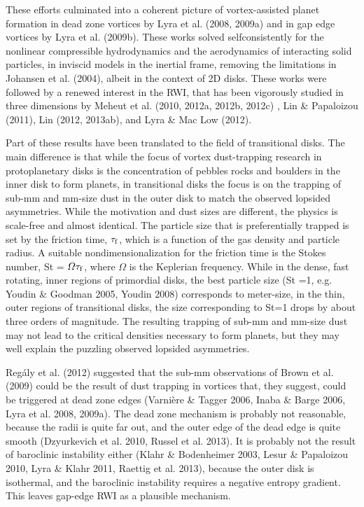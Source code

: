 \documentclass[apj]{emulateapj}
\begin{document}
These efforts culminated into a coherent picture of vortex-assisted
planet formation in dead zone vortices by Lyra et al. (2008, 2009a) and in 
gap edge vortices by Lyra et al. (2009b). These works solved
selfconsistently for the nonlinear compressible hydrodynamics and the
aerodynamics of interacting solid particles, in inviscid models in the
inertial frame, removing the limitations in Johansen et al. (2004),
albeit in the context of 2D disks. These works were followed by a renewed
interest in the RWI, that has been vigorously studied in three
dimensions by Meheut et al. (2010, 2012a, 2012b, 2012c) , Lin \&
Papaloizou (2011),  Lin (2012, 2013ab), and Lyra \& Mac Low (2012). 

Part of these results have been translated to the field of
transitional disks. The main difference is that while the focus 
of vortex dust-trapping research in protoplanetary disks is the
concentration of pebbles rocks and boulders in the inner disk to form
planets, in transitional disks the focus is on the trapping of sub-mm
and mm-size dust in the outer disk to match the observed lopsided 
asymmetries. While the motivation and dust sizes are different, the
physics is scale-free and almost identical. The particle size that is
preferentially trapped is set by the friction time, $\tau_{\rm f}$, which is a
function of the gas density and particle radius. A suitable nondimensionalization for the
friction time is the Stokes number, St = $\varOmega \tau_{\rm f}$,
where $\varOmega$ is the Keplerian frequency. While in the dense, fast
rotating, inner regions of primordial disks, the best particle size (St =1, e.g. 
Youdin \& Goodman 2005, Youdin 2008)
corresponds to meter-size, in the thin, outer regions of transitional
disks, the size corresponding to St=1 drops by about three orders of
magnitude. The resulting trapping of sub-mm and mm-size dust may not
lead to the critical densities necessary to form planets, but they may
well explain the puzzling observed lopsided asymmetries. 

Reg\'aly et al. (2012) suggested that the sub-mm 
observations of Brown et al. (2009) could be the result of dust
trapping in vortices that, they suggest, could be triggered at dead
zone edges (Varni\`ere \& Tagger 2006, Inaba \& Barge 2006, Lyra et
al. 2008, 2009a). The dead zone mechanism is probably not reasonable,
because the radii is quite far out, and the outer edge of the dead
edge is quite smooth (Dzyurkevich et al. 2010, Russel et al. 2013). It is probably
not the result of baroclinic instability either (Klahr \& Bodenheimer
2003, Lesur \& Papaloizou 2010, Lyra \& Klahr 2011, Raettig et al. 2013), because the outer
disk is isothermal, and the baroclinic instability requires a negative
entropy gradient. This leaves gap-edge RWI as a plausible mechanism. 
\end{document}
